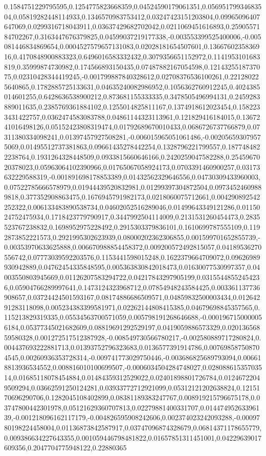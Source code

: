 0.1584751229795595,0.1254775823668359,0.04524590179061351,0.05695179934683504,0.05819282448114933,0.1346570983753412,0.03247423151203804,0.09965096407647069,0.0299316718043911,0.03637429682702042,0.0211069451616893,0.2590557184702267,0.3163447676379825,0.04599037219177338,-0.003553399525400006,-0.005081446834869654,0.0004527579657131083,0.02028181654507601,0.1366760235836916,0.4170848900883323,0.6496016583332432,0.3079356651152972,0.1141953101683819,0.35999874730982,0.174566893150435,0.07487882167054598,0.1214325518737075,0.02310428344419245,-0.001799887840328612,0.02708376536100261,0.221280225640865,0.1782885725133631,0.04635240082986952,0.1056362760912245,0.4024385014601255,0.6428636538900212,0.873681155333335,0.3478505496994131,0.2459283889011635,0.2385769361884102,0.1255014825811167,0.1374918612023454,0.1582233431422757,0.0362474583083788,0.04861144323113961,0.121829416184015,0.1367241016498126,0.05152423808319474,0.01792689670010433,0.0686726737766879,0.07311380334098241,0.01397457927508281,-0.006015965051061486,-0.002056593079575069,0.01495512737381863,0.09661435278442254,0.1328796221799557,0.1877484822238764,0.1931264328448509,0.0933815660646166,0.2420259047582288,0.2545967020378023,0.05963064102390966,0.01765067058924173,0.0703391460900257,0.03173632229588319,-0.001891698178853389,0.01432562329646556,0.04730309433960003,0.07522785666578979,0.01944439520832981,0.01299397304872504,0.09734524609889818,0.377352908863475,0.1676945791982173,0.0218060075712661,0.004290892542252322,0.006133483890538734,0.04602052516289046,0.01499643349121286,0.0115024752475934,0.1718423779790917,0.3447992504114009,0.2131531260454473,0.2835523767238832,0.1698952975228492,0.2915303379836101,0.1610699787555109,0.1192873852221573,0.2921995302623939,0.08000202362306855,0.001599701652855739,-0.00353970633625888,0.006670988854458372,0.009200572492815057,0.04189536270556742,0.07773039592203576,0.1153441598015248,0.1622379664709072,0.09626989930942889,0.04762454335848595,0.005363830842018473,0.01630077530997357,0.04003550803945669,0.01126207583294722,0.04217843297905199,0.03155448552454236,0.05904766289997641,0.1473124323968712,0.07854948243584425,0.003361137736908657,0.03724424501593167,0.08174886686509571,0.04859832500003434,0.01264291283118098,0.005234383399581971,0.02262144808415385,0.04679698845357565,0.115213829319335,0.05534563700571059,0.005798191268646688,-0.0001967150000056184,0.05377345021682609,0.08819691292529197,0.0419059886573329,0.02013656859580328,0.001272517512387928,-0.008549730566780217,-0.002580889717280824,0.004437693222881713,0.01393752796323683,0.0136577391914786,0.007698587508704545,0.00260936353728314,-0.009741773029750446,-0.003686825689793094,0.006618813936534552,0.008816010100699507,-0.0006034504284748027,0.02808861535703514,0.01685118078454884,0.01484359312529022,0.02401898801726784,0.01246722049509294,0.03662591250124281,0.03933772712921099,0.05312121202638824,0.1215170696290706,0.1282045108402899,0.08381189383247767,0.008919215796675178,0.03747800442301978,0.05121629360707813,0.02279881400331707,0.01447495263396139,-0.001218096162117179,-0.004826595908242606,0.002374023242093288,-0.0009780198224458004,0.01136873842587917,0.03747096874328679,0.06814371178655779,0.009386634227643355,0.001059446798481822,0.01657851311451001,0.04229639017609356,0.2047704775948122,0.22880365